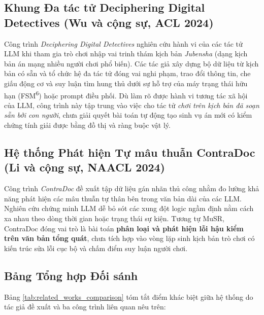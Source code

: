 \subsection{Khung Đa tác tử Deciphering Digital Detectives (Wu và cộng sự, ACL 2024)}
Công trình \textit{Deciphering Digital Detectives} \cite{wu2024deciphering} nghiên cứu hành vi của các tác tử LLM khi tham gia trò chơi nhập vai trinh thám kịch bản \textit{Jubensha} (dạng kịch bản án mạng nhiều người chơi phổ biến). Các tác giả xây dựng bộ dữ liệu từ kịch bản có sẵn và tổ chức hệ đa tác tử đóng vai nghi phạm, trao đổi thông tin, che giấu động cơ và suy luận tìm hung thủ dưới sự hỗ trợ của máy trạng thái hữu hạn (FSM\textsuperscript{6}) hoặc prompt điều phối. Dù làm rõ được hành vi tương tác xã hội của LLM, công trình này tập trung vào việc cho tác tử \textit{chơi trên kịch bản đã soạn sẵn bởi con người}, chưa giải quyết bài toán tự động tạo sinh vụ án mới có kiểm chứng tính giải được bằng đồ thị và ràng buộc vật lý.

\subsection{Hệ thống Phát hiện Tự mâu thuẫn ContraDoc (Li và cộng sự, NAACL 2024)}
Công trình \textit{ContraDoc} \cite{li2024contradoc} đề xuất tập dữ liệu gán nhãn thủ công nhằm đo lường khả năng phát hiện các mâu thuẫn tự thân bên trong văn bản dài của các LLM. Nghiên cứu chứng minh LLM dễ bỏ sót các xung đột logic ngầm định nằm cách xa nhau theo dòng thời gian hoặc trạng thái sự kiện. Tương tự MuSR, ContraDoc đóng vai trò là bài toán \textbf{phân loại và phát hiện lỗi hậu kiểm trên văn bản tổng quát}, chưa tích hợp vào vòng lặp sinh kịch bản trò chơi có kiến trúc sửa lỗi cục bộ và chấm điểm suy luận người chơi.

\subsection{Bảng Tổng hợp Đối sánh}
Bảng \ref{tab:related_works_comparison} tóm tắt điểm khác biệt giữa hệ thống do tác giả đề xuất và ba công trình liên quan nêu trên:

